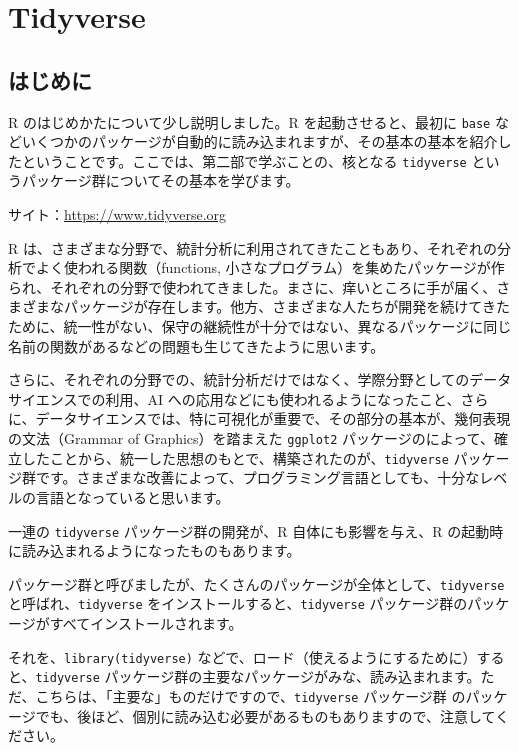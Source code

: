 \documentclass[
  xelatex, ja=standard]{bxjsbook}
\theoremstyle{definition}
\theoremstyle{definition}
\theoremstyle{definition}
\theoremstyle{definition}
\theoremstyle{remark}
\begin{document}
\hypertarget{tidyverse}{%
\chapter{Tidyverse}\label{tidyverse}}

\hypertarget{ux306fux3058ux3081ux306b-1}{%
\section{はじめに}\label{ux306fux3058ux3081ux306b-1}}

R のはじめかたについて少し説明しました。R を起動させると、最初に \texttt{base} などいくつかのパッケージが自動的に読み込まれますが、その基本の基本を紹介したということです。ここでは、第二部で学ぶことの、核となる \texttt{tidyverse} というパッケージ群についてその基本を学びます。

サイト：\url{https://www.tidyverse.org}

R は、さまざまな分野で、統計分析に利用されてきたこともあり、それぞれの分析でよく使われる関数（functions, 小さなプログラム）を集めたパッケージが作られ、それぞれの分野で使われてきました。まさに、痒いところに手が届く、さまざまなパッケージが存在します。他方、さまざまな人たちが開発を続けてきたために、統一性がない、保守の継続性が十分ではない、異なるパッケージに同じ名前の関数があるなどの問題も生じてきたように思います。

さらに、それぞれの分野での、統計分析だけではなく、学際分野としてのデータサイエンスでの利用、AI への応用などにも使われるようになったこと、さらに、データサイエンスでは、特に可視化が重要で、その部分の基本が、幾何表現の文法（Grammar of Graphics）を踏まえた \texttt{ggplot2} パッケージのによって、確立したことから、統一した思想のもとで、構築されたのが、\texttt{tidyverse} パッケージ群です。さまざまな改善によって、プログラミング言語としても、十分なレベルの言語となっていると思います。

一連の \texttt{tidyverse} パッケージ群の開発が、R 自体にも影響を与え、R の起動時に読み込まれるようになったものもあります。

パッケージ群と呼びましたが、たくさんのパッケージが全体として、\texttt{tidyverse} と呼ばれ、\texttt{tidyverse} をインストールすると、\texttt{tidyverse} パッケージ群のパッケージがすべてインストールされます。

それを、\texttt{library(tidyverse)} などで、ロード（使えるようにするために）すると、\texttt{tidyverse} パッケージ群の主要なパッケージがみな、読み込まれます。ただ、こちらは、「主要な」ものだけですので、\texttt{tidyverse} パッケージ群 のパッケージでも、後ほど、個別に読み込む必要があるものもありますので、注意してください。
\end{document}
